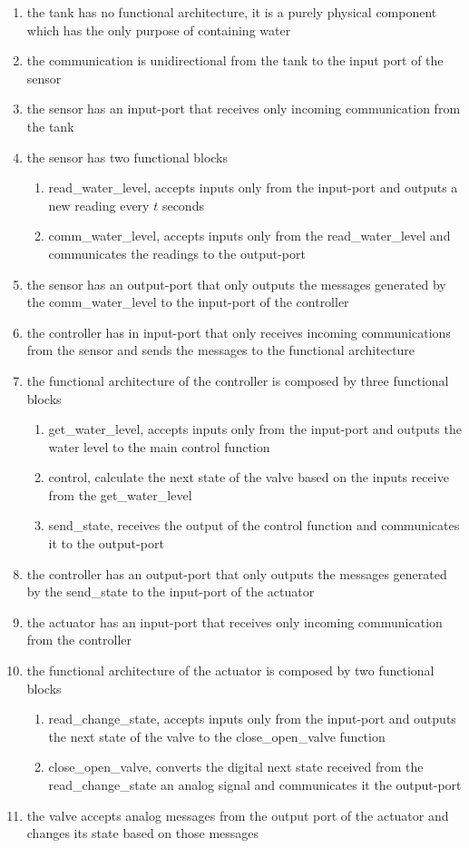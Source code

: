 \begin{enumerate}[start=1, label={req\arabic*)}]
	\item the tank has no functional architecture, it is a purely physical component which has the only purpose of containing water
	\item the communication is unidirectional from the tank to the input port of the sensor
	\item the sensor has an input-port that receives only incoming communication from the tank
	\item the sensor has two functional blocks
		\begin{enumerate}[label={req4.\arabic*)}]
			\item read\_water\_level, accepts inputs only from the input-port and outputs a new reading every $t$ seconds
			\item comm\_water\_level, accepts inputs only from the read\_water\_level and communicates the readings to the output-port
		\end{enumerate}
	\item the sensor has an output-port that only outputs the messages generated by the comm\_water\_level to the input-port of the controller
	\item the controller has in input-port that only receives incoming communications from the sensor and sends the messages to the functional architecture
	\item the functional architecture of the controller is composed by three functional blocks
		\begin{enumerate}[label={req7.\arabic*)}]
			\item get\_water\_level, accepts inputs only from the input-port and outputs the water level to the main control function
			\item control, calculate the next state of the valve based on the inputs receive from the get\_water\_level
			\item send\_state, receives the output of the control function and communicates it to the output-port
		\end{enumerate}
	\item the controller has an output-port that only outputs the messages generated by the send\_state to the input-port of the actuator 
	\item the actuator has an input-port that receives only incoming communication from the controller 
	\item the functional architecture of the actuator is composed by two functional blocks
		\begin{enumerate}[label={req10.\arabic*)}]
			\item read\_change\_state, accepts inputs only from the input-port and outputs the next state of the valve to the close\_open\_valve function
			\item close\_open\_valve, converts the digital next state received from the read\_change\_state an analog signal and communicates it the output-port
		\end{enumerate}
	\item the valve accepts analog messages from the output port of the actuator and changes its state based on those messages
\end{enumerate}

